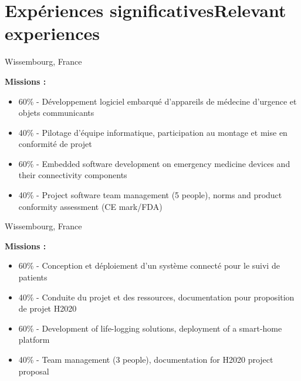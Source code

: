 \section{\ifnativelang Exp\'eriences significatives\else Relevant experiences\fi}

{}{}{Wissembourg, France}{
\textbf{Missions :} 
\begin{itemize}
\ifnativelang
\item 60\% - D\'eveloppement logiciel embarqu\'e d'appareils de médecine d'urgence et objets communicants
\item 40\% - Pilotage d'\'equipe informatique, participation au montage et mise en conformit\'e de projet
\else
\item 60\% - Embedded software development on emergency medicine devices and their connectivity components
\item 40\% - Project software team management (5 people),  norms and product conformity assessment (CE mark/FDA)
\fi
\end{itemize}
}

\vspace{\ItemsSpacing}

{}{}{Wissembourg, France}{
\textbf{Missions :} 
\begin{itemize}
\ifnativelang
\item 60\% - Conception et d\'eploiement d'un syst\`eme connect\'e pour le suivi de patients
\item 40\% - Conduite du projet et des ressources, documentation pour proposition de projet H2020
\else
\item 60\% - Development of life-logging solutions, deployment of a smart-home platform
\item 40\% - Team management (3 people), documentation for H2020 project proposal
\fi
\end{itemize}
}

